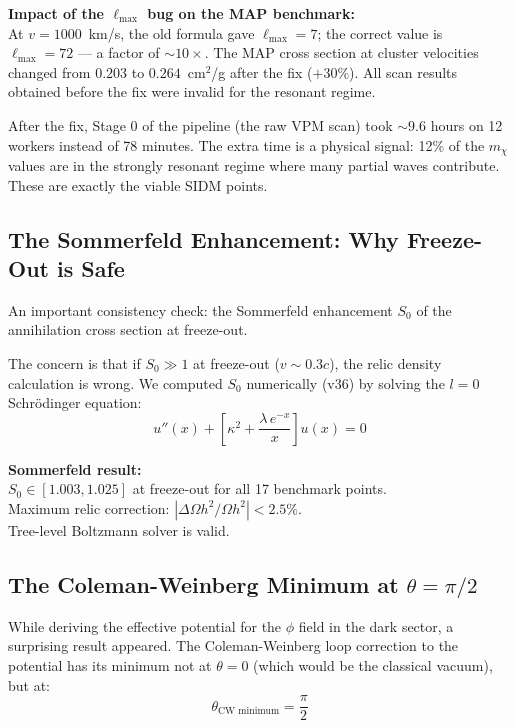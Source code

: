 \documentclass[12pt, a4paper]{article}
\begin{document}
\begin{failbox}
\textbf{Impact of the $\ell_\text{max}$ bug on the MAP benchmark:}\\
At $v = 1000$~km/s, the old formula gave $\ell_\text{max} = 7$; the correct value is $\ell_\text{max} = 72$ --- a factor of $\sim 10\times$. The MAP cross section at cluster velocities changed from $0.203$ to $0.264$~cm$^2$/g after the fix ($+30\%$). All scan results obtained before the fix were invalid for the resonant regime.
\end{failbox}

After the fix, Stage 0 of the pipeline (the raw VPM scan) took $\sim 9.6$ hours on 12 workers instead of 78 minutes. The extra time is a physical signal: 12\% of the $m_\chi$ values are in the strongly resonant regime where many partial waves contribute. These are exactly the viable SIDM points.

\subsection{The Sommerfeld Enhancement: Why Freeze-Out is Safe}

An important consistency check: the Sommerfeld enhancement $S_0$ of the annihilation cross section at freeze-out.

The concern is that if $S_0 \gg 1$ at freeze-out ($v \sim 0.3c$), the relic density calculation is wrong. We computed $S_0$ numerically (v36) by solving the $l=0$ Schrödinger equation:
\begin{equation}
  u''(x) + \left[\kappa^2 + \frac{\lambda\,e^{-x}}{x}\right]u(x) = 0
\end{equation}

\begin{successbox}
\textbf{Sommerfeld result:}\\
$S_0 \in [1.003, 1.025]$ at freeze-out for all 17 benchmark points.\\
Maximum relic correction: $|\Delta\Omega h^2/\Omega h^2| < 2.5\%$.\\
Tree-level Boltzmann solver is valid.
\end{successbox}

\subsection{The Coleman-Weinberg Minimum at $\theta = \pi/2$}

While deriving the effective potential for the $\phi$ field in the dark sector, a surprising result appeared. The Coleman-Weinberg loop correction to the potential has its minimum not at $\theta = 0$ (which would be the classical vacuum), but at:
\begin{equation}
  \theta_\text{CW minimum} = \frac{\pi}{2}
\end{equation}
\end{document}
